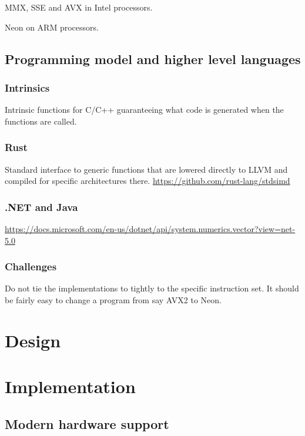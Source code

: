\documentclass{article}
\begin{document}
MMX, SSE and AVX in Intel processors.

Neon on ARM processors.

\subsection{Programming model and higher level languages}

\subsubsection{Intrinsics}

Intrinsic functions for C/C++ guaranteeing what code is generated when the functions are called.

\subsubsection{Rust}

Standard interface to generic functions that are lowered directly to LLVM and compiled for specific architectures there.
\url{https://github.com/rust-lang/stdsimd}

\subsubsection{.NET and Java}

\url{https://docs.microsoft.com/en-us/dotnet/api/system.numerics.vector?view=net-5.0}


\subsubsection{Challenges}

Do not tie the implementations to tightly to the specific instruction set. It should be fairly easy to change a program from say AVX2 to Neon.

\section{Design}

\section{Implementation}

\subsection{Modern hardware support}
\end{document}
